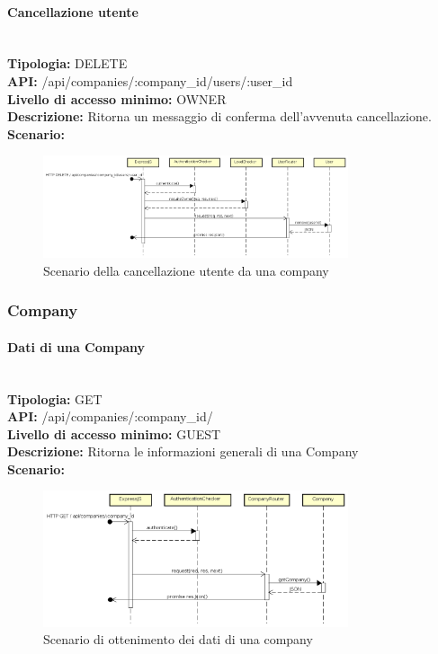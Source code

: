 \newpage
\paragraph{Cancellazione utente}\mbox{}\\
\textbf{Tipologia:} DELETE \\
\textbf{API:} /api/companies/:company\_id/users/:user\_id \\
\textbf{Livello di accesso minimo:} OWNER \\
\textbf{Descrizione:} Ritorna un messaggio di conferma dell'avvenuta cancellazione. \\
\textbf{Scenario:} 
\begin{figure}[H]
\centering
\includegraphics[width=0.8\textwidth]{res/sections/backend/sequence/(DELETE)user.png}
\caption{Scenario della cancellazione utente da una company}
\end{figure}

\newpage
\subsubsection{Company}
\paragraph{Dati di una Company}\mbox{}\\
\textbf{Tipologia:} GET \\
\textbf{API:} /api/companies/:company\_id/ \\
\textbf{Livello di accesso minimo:} GUEST \\
\textbf{Descrizione:} Ritorna le informazioni generali di una Company \\
\textbf{Scenario:} 
\begin{figure}[H]
\centering
\includegraphics[width=0.8\textwidth]{res/sections/backend/sequence/(GET)company.png}
\caption{Scenario di ottenimento dei dati di una company}
\end{figure}

